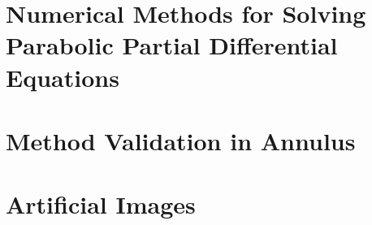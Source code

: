 \documentclass{uofsthesis-cs}
\begin{document}
  \uofsappendix %

  \begin{appendices}
    
    \chapter{Numerical Methods for Solving Parabolic Partial Differential Equations}
      

    \chapter{Method Validation in Annulus}
      

    \chapter{Artificial Images}
      

    
  \end{appendices}
  
  



\end{document}
